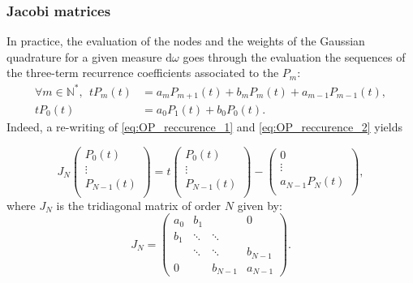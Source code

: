 \documentclass[twoside,11pt]{book}
\numberwithin{theorem}{chapter}
\numberwithin{definition}{chapter}
\numberwithin{proposition}{chapter}
\numberwithin{corollary}{chapter}
\numberwithin{example}{chapter}
\numberwithin{lemma}{chapter}
\begin{document}
\subsubsection{Jacobi matrices}
 
In practice, the evaluation of the nodes and the weights of the Gaussian quadrature for a given measure $\mathrm{d}\omega$ goes through the evaluation the sequences of the three-term recurrence coefficients associated to the $P_{m}$:
\begin{align}\label{eq:OP_reccurence_1}
\forall m \in \mathbb{N}^{*}, \:\:t P_{m}(t) & = a_{m}P_{m+1}(t) + b_{m}P_{m}(t) + a_{m-1}P_{m-1}(t),\\
\label{eq:OP_reccurence_2}
t P_{0}(t) & = a_{0}P_{1}(t) + b_{0}P_{0}(t) .
\end{align}
Indeed, a re-writing of \eqref{eq:OP_reccurence_1} and \eqref{eq:OP_reccurence_2} yields 

\begin{equation}\label{eq:matrix_OP_reccurence}
J_{N} \begin{pmatrix}
P_{0}(t)  \\
\vdots \\
P_{N-1}(t) \\
\end{pmatrix} = t \begin{pmatrix}
P_{0}(t)  \\
\vdots \\
P_{N-1}(t) \\
\end{pmatrix} - \begin{pmatrix}
0  \\
\vdots \\
a_{N-1}P_{N}(t) \\
\end{pmatrix},
\end{equation}
where $J_{N}$ is the tridiagonal matrix of order $N$ given by:
\begin{equation}
J_N = \left( \begin{array}{cccc}
a_{0} & b_{1} & & 0\\
b_{1} & \ddots & \ddots & \\
& \ddots & \ddots & b_{N-1} \\
0 & & b_{N-1} & a_{N-1} \end{array} \right) .
\end{equation}
\end{document}
